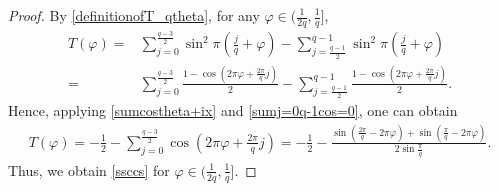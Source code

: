 \documentclass[12pt]{amsart}
\theoremstyle{plain}
\theoremstyle{definition}
\begin{document}
\begin{proof}
		 By \eqref{definitionofT_qtheta}, for any $\varphi\in \Big(\frac{1}{2q},\frac{1}{q}\Big]$,
		\begin{align}
			T(\varphi)=&\sum_{j=0}^{\frac{q-3}{2}}\sin^2\pi\left(\frac{j}{q}+\varphi\right )-\sum_{j=\frac{q-1}{2}}^{q-1}\sin^2\pi\left(\frac{j}{q}+\varphi\right)\nonumber\\
			=&\sum_{j=0}^{\frac{q-3}{2}}\frac{1-\cos\left(2\pi\varphi+\frac{2\pi}{q}j\right)}{2}-\sum_{j=\frac{q-1}{2}}^{{q-1}}\frac{1-\cos\left(2\pi\varphi+\frac{2\pi}{q}j\right)}{2}\nonumber.
		\end{align}
		Hence, applying \eqref{sumcostheta+ix} and \eqref{sumj=0q-1cos=0}, one can obtain 
		\begin{align}
			T(\varphi)=-\frac{1}{2}-\sum_{j=0}^{\frac{q-3}{2}}\cos\left(2\pi\varphi+\frac{2\pi}{q}j\right)=-\frac{1}{2}-\frac{\sin\left(\frac{2\pi}{q}-2\pi\varphi\right)+\sin\left(\frac{\pi}{q}-2\pi\varphi\right)}{2\sin\frac{\pi}{q}}.\nonumber
		\end{align}
		Thus, we obtain \eqref{ssccs} for $\varphi\in\Big(\frac{1}{2q},\frac{1}{q}\Big].$
	\end{proof}
	
\end{document}

